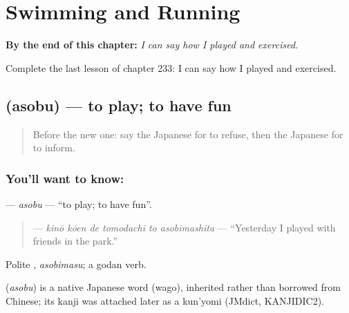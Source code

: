 
\chapter{Swimming and Running}
\label{ch:ja-swimming-and-running}

\begin{chapteropening}
\textbf{By the end of this chapter:} \emph{I can say how I played and exercised.}

Complete the last lesson of chapter 233: I can say how I played and exercised.
\end{chapteropening}

\section[\texorpdfstring{\ja{あそぶ} (asobu)}{あそぶ (asobu)}]{ (asobu) — to play; to have fun}

\label{lesson:JA-C233-asobu}



\begin{quote}
Before the new one: say the Japanese for to refuse, then the Japanese for to inform.
\end{quote}

\subsection*{You'll want to know: }
\textbf{} — \emph{asobu} — \textquotedblleft{}to play; to have fun\textquotedblright{}.

\begin{quote}
\textbf{   } — \emph{kinō kōen de tomodachi to asobimashita} — \textquotedblleft{}Yesterday I played with friends in the park.\textquotedblright{}
\end{quote}

Polite \textbf{}, \emph{asobimasu}; a godan verb.

\begin{cousinweb}
\textbf{} (\emph{asobu}) is a native Japanese word (wago), inherited rather than borrowed from Chinese; its kanji was attached later as a kun'yomi (JMdict, KANJIDIC2).
\end{cousinweb}


